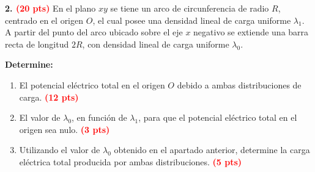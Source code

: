 \documentclass[12pt]{article}
\begin{document}
\newpage





\noindent
\textbf{2. \textcolor{red}{(20 pts)}} 
En el plano $xy$ se tiene un arco de circunferencia de radio $R$, centrado en el origen $O$, el cual posee una densidad lineal de carga uniforme $\lambda_1$. A partir del punto del arco ubicado sobre el eje $x$ negativo se extiende una barra recta de longitud $2R$, con densidad lineal 
de carga uniforme $\lambda_0$. 

\vspace{0.25cm}

\noindent
\begin{minipage}[t]{0.58\textwidth}
\vspace{0pt}

\textbf{Determine:}

\vspace{0.25cm}

\begin{enumerate}[
    label=\alph*),
    leftmargin=0.55cm,
    labelsep=0.15cm,
    itemsep=0.55cm,
    topsep=0pt
]

    \item El potencial eléctrico total en el origen $O$ debido a 
    ambas distribuciones de carga. 
    \textcolor{red}{\textbf{(12 pts)}}

    \item El valor de $\lambda_0$, en función de $\lambda_1$, para 
    que el potencial eléctrico total en el origen sea nulo. 
    \textcolor{red}{\textbf{(3 pts)}}

    \item Utilizando el valor de $\lambda_0$ obtenido en el apartado 
    anterior, determine la carga eléctrica total producida por ambas distribuciones. 
    \textcolor{red}{\textbf{(5 pts)}}

\end{enumerate}

\end{minipage}
\hfill
%
\end{document}
